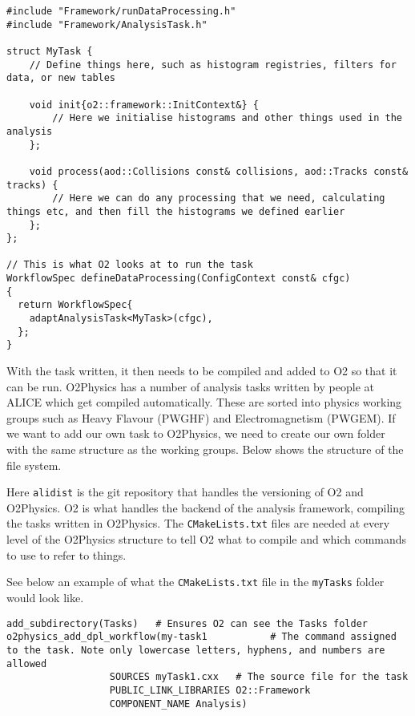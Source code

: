 \begin{verbatim}
#include "Framework/runDataProcessing.h"
#include "Framework/AnalysisTask.h"

struct MyTask {
    // Define things here, such as histogram registries, filters for data, or new tables

    void init{o2::framework::InitContext&} {
        // Here we initialise histograms and other things used in the analysis
    };

    void process(aod::Collisions const& collisions, aod::Tracks const& tracks) {
        // Here we can do any processing that we need, calculating things etc, and then fill the histograms we defined earlier
    };
};

// This is what O2 looks at to run the task
WorkflowSpec defineDataProcessing(ConfigContext const& cfgc)
{
  return WorkflowSpec{
    adaptAnalysisTask<MyTask>(cfgc),
  };
}

\end{verbatim}

With the task written, it then needs to be compiled and added to O2 so that it can be run. O2Physics has a number of analysis tasks written by people at ALICE which get compiled automatically. These are sorted into physics working groups such as Heavy Flavour (PWGHF) and Electromagnetism (PWGEM). If we want to add our own task to O2Physics, we need to create our own folder with the same structure as the working groups. Below shows the structure of the file system.


Here \texttt{alidist} is the git repository that handles the versioning of O2 and O2Physics. O2 is what handles the backend of the analysis framework, compiling the tasks written in O2Physics. The \texttt{CMakeLists.txt} files are needed at every level of the O2Physics structure to tell O2 what to compile and which commands to use to refer to things. 

See below an example of what the \texttt{CMakeLists.txt} file in the \texttt{myTasks} folder would look like.

\begin{verbatim}
add_subdirectory(Tasks)   # Ensures O2 can see the Tasks folder
o2physics_add_dpl_workflow(my-task1           # The command assigned to the task. Note only lowercase letters, hyphens, and numbers are allowed
                  SOURCES myTask1.cxx   # The source file for the task
                  PUBLIC_LINK_LIBRARIES O2::Framework
                  COMPONENT_NAME Analysis)
\end{verbatim}

